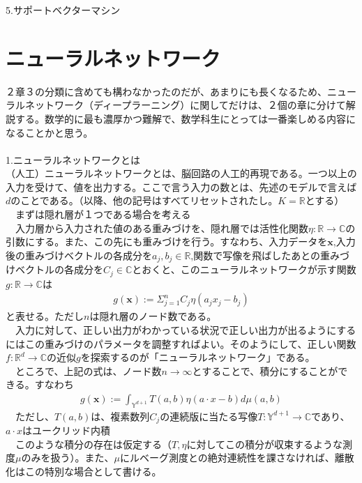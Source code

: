 \documentclass{jsarticle}
\begin{document}
5.サポートベクターマシン\\


\newpage
\section{ニューラルネットワーク}
２章３の分類に含めても構わなかったのだが、あまりにも長くなるため、ニューラルネットワーク（ディープラーニング）に関してだけは、２個の章に分けて解説する。数学的に最も濃厚かつ難解で、数学科生にとっては一番楽しめる内容になることかと思う。\\
　\\
1.ニューラルネットワークとは\\
 （人工）ニューラルネットワークとは、脳回路の人工的再現である。一つ以上の入力を受けて、値を出力する。ここで言う入力の数とは、先述のモデルで言えば$d$のことである。（以降、他の記号はすべてリセットされたし。$K=\mathbb{R}$とする）\\
　まずは隠れ層が１つである場合を考える\\
　入力層から入力された値のある重みづけを、隠れ層では活性化関数$\eta:\mathbb{R}\rightarrow \mathbb{C}$の引数にする。また、この先にも重みづけを行う。すなわち、入力データを$\bm{x}$,入力後の重みづけベクトルの各成分を$a_j,b_j\in\mathbb{R}$,関数で写像を飛ばしたあとの重みづけベクトルの各成分を$C_j\in\mathbb{C}$とおくと、このニューラルネットワークが示す関数$g:\mathbb{R}\rightarrow\mathbb{C}$は
\begin{eqnarray}
g(\bm{x}):=\Sigma_{j=1}^nC_j\eta(a_jx_j-b_j)
\end{eqnarray}
と表せる。ただし$n$は隠れ層のノード数である。\\
　入力に対して、正しい出力がわかっている状況で正しい出力が出るようにするにはこの重みづけのパラメータを調整すればよい。そのようにして、正しい関数$f:\mathbb{R}^d\rightarrow\mathbb{C}$の近似$g$を探索するのが「ニューラルネットワーク」である。\\
　ところで、上記の式は、ノード数$n\rightarrow\infty$とすることで、積分にすることができる。すなわち
\begin{eqnarray}
g(\bm{x}):=\int_{\mathbb{Y}^{d+1}}T(a,b)\eta(a\cdot x-b)d\mu(a,b)
\end{eqnarray}
　ただし、$T(a,b)$は、複素数列$C_j$の連続版に当たる写像$T:\mathbb{Y}^{d+1}\rightarrow\mathbb{C}$であり、$a\cdot x$はユークリッド内積\\
　このような積分の存在は仮定する（$T,\eta$に対してこの積分が収束するような測度$\mu$のみを扱う）。また、$\mu$にルベーグ測度との絶対連続性を課さなければ、離散化はこの特別な場合として書ける。\\
\end{document}
